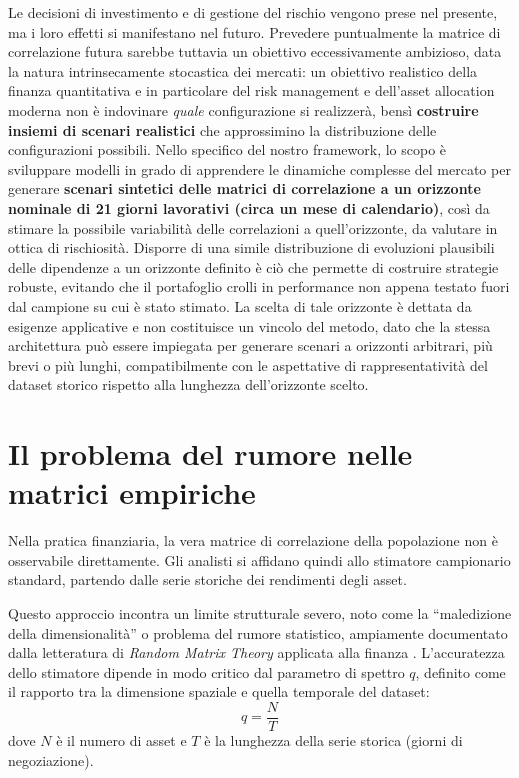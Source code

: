 Le decisioni di investimento e di gestione del rischio vengono prese nel presente, ma i loro effetti si manifestano nel futuro. Prevedere puntualmente la matrice di correlazione futura sarebbe tuttavia un obiettivo eccessivamente ambizioso, data la natura intrinsecamente stocastica dei mercati: un obiettivo realistico della finanza quantitativa e in particolare del risk management e dell'asset allocation moderna non è indovinare \emph{quale} configurazione si realizzerà, bensì \textbf{costruire insiemi di scenari realistici} che approssimino la distribuzione delle configurazioni possibili. Nello specifico del nostro framework, lo scopo è sviluppare modelli in grado di apprendere le dinamiche complesse del mercato per generare \textbf{scenari sintetici delle matrici di correlazione a un orizzonte nominale di 21 giorni lavorativi (circa un mese di calendario)}, così da stimare la possibile variabilità delle correlazioni a quell'orizzonte, da valutare in ottica di rischiosità. Disporre di una simile distribuzione di evoluzioni plausibili delle dipendenze a un orizzonte definito è ciò che permette di costruire strategie robuste, evitando che il portafoglio crolli in performance non appena testato fuori dal campione su cui è stato stimato. La scelta di tale orizzonte è dettata da esigenze applicative e non costituisce un vincolo del metodo, dato che la stessa architettura può essere impiegata per generare scenari a orizzonti arbitrari, più brevi o più lunghi, compatibilmente con le aspettative di rappresentatività del dataset storico rispetto alla lunghezza dell'orizzonte scelto.

\section{Il problema del rumore nelle matrici empiriche}
\label{sec:rumore_empirico}

Nella pratica finanziaria, la vera matrice di correlazione della popolazione non è osservabile direttamente. Gli analisti si affidano quindi allo stimatore campionario standard, partendo dalle serie storiche dei rendimenti degli asset. 

Questo approccio incontra un limite strutturale severo, noto come la ``maledizione della dimensionalità'' o problema del rumore statistico, ampiamente documentato dalla letteratura di \emph{Random Matrix Theory} applicata alla finanza \citep{bouchaud2009rmt, plerou1999universal, plerou2002randommatrix}. L'accuratezza dello stimatore dipende in modo critico dal parametro di spettro $q$, definito come il rapporto tra la dimensione spaziale e quella temporale del dataset:
\begin{equation}
q = \frac{N}{T}
\end{equation}
dove $N$ è il numero di asset e $T$ è la lunghezza della serie storica (giorni di negoziazione).

